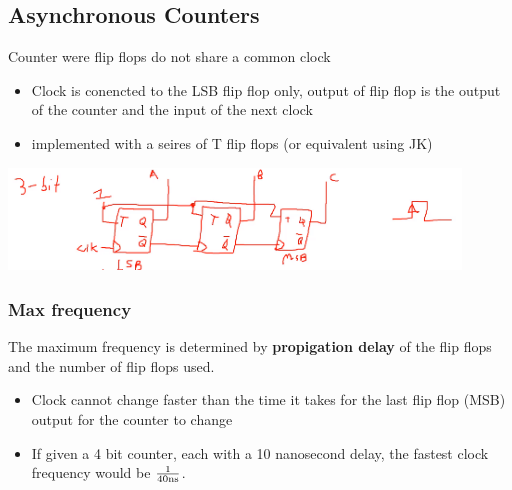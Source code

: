 \documentclass[a4paper,12pt]{article}
\begin{document}
        \subsection{Asynchronous Counters}
            Counter were flip flops do not share a common clock
            \begin{itemize}
                \item Clock is conencted to the LSB flip flop only, output of flip flop is the output of the counter and the input of the next clock
                \item implemented with a seires of T flip flops (or equivalent using JK)
            \end{itemize}
            \includegraphics[width=12cm]{AsyncClock1.png}
            \subsubsection{Max frequency}
                The maximum frequency is determined by \textbf{propigation delay} of the flip flops and the number of flip flops used.
                \begin{itemize}
                    \item Clock cannot change faster than the time it takes for the last flip flop (MSB) output for the counter to change
                    \item If given a 4 bit counter, each with a 10 nanosecond delay, the fastest clock frequency would be $\frac{1}{40\textnormal{ns}}$.
                \end{itemize}
\end{document}
